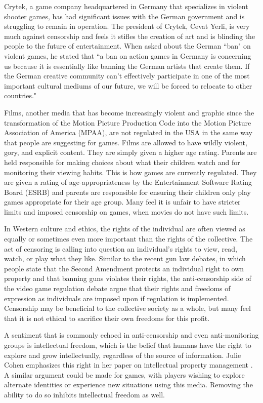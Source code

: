 Crytek, a game company headquartered in Germany that specializes in violent shooter games, has had significant issues with the German government and is struggling to remain in operation. The president of Crytek, Cevat Yerli, is very much against censorship and feels it stifles the creation of art and is blinding the people to the future of entertainment. When asked about the German ``ban" on violent games, he stated that ``a ban on action games in Germany is concerning us because it is essentially like banning the German artists that create them. If the German creative community can't effectively participate in one of the most important cultural mediums of our future, we will be forced to relocate to other countries." \cite{yerli}

Films, another media that has become increasingly violent and graphic since the transformation of the Motion Picture Production Code into the Motion Picture Association of America (MPAA), are not regulated in the USA in the same way that people are suggesting for games. Films are allowed to have wildly violent, gory, and explicit content. They are simply given a higher age rating. Parents are held responsible for making choices about what their children watch and for monitoring their viewing habits. This is how games are currently regulated. They are given a rating of age-appropriateness by the Entertainment Software Rating Board (ESRB) and parents are responsible for ensuring their children only play games appropriate for their age group. Many feel it is unfair to have stricter limits and imposed censorship on games, when movies do not have such limits.

In Western culture and ethics, the rights of the individual are often viewed as equally or sometimes even more important than the rights of the collective. The act of censoring is calling into question an individual's rights to view, read, watch, or play what they like. Similar to the recent gun law debates, in which people state that the Second Amendment protects an individual right to own property and that banning guns violates their rights, the anti-censorship side of the video game regulation debate argue that their rights and freedoms of expression as individuals are imposed upon if regulation is implemented. Censorship may be beneficial to the collective society as a whole, but many feel that it is not ethical to sacrifice their own freedoms for this profit. 

A sentiment that is commonly echoed in anti-censorship and even anti-monitoring groups is intellectual freedom, which is the belief that humans have the right to explore and grow intellectually, regardless of the source of information. Julie Cohen emphasizes this right in her paper on intellectual property management \cite{cohen1995}. A similar argument could be made for games, with players wishing to explore alternate identities or experience new situations using this media. Removing the ability to do so inhibits intellectual freedom as well.

